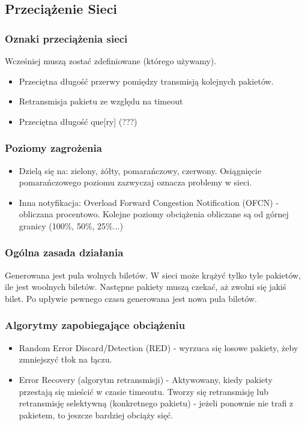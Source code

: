 		\subsection{Przeciążenie Sieci}
		
		\subsubsection{Oznaki przeciążenia sieci }
			Wcześniej muszą zostać zdefiniowane (którego używamy).
			\begin{itemize}
				\item Przeciętna długość przerwy pomiędzy transmisją kolejnych pakietów.
				\item Retransmisja pakietu ze względu na timeout
				\item Przeciętna długość que[ry] (???)
			\end{itemize}
				\subsubsection{Poziomy zagrożenia}
				\begin{itemize}
					\item Dzielą się na: zielony, żółty, pomarańczowy, czerwony. Osiągnięcie pomarańczowego poziomu zazwyczaj oznacza problemy w sieci.
					\item Inna notyfikacja: Overload Forward Congestion Notification (OFCN) - obliczana procentowo. Kolejne poziomy obciążenia obliczane są od górnej granicy (100\%, 50\%, 25\%...)
				\end{itemize}
			\subsubsection{Ogólna zasada działania}
				Generowana jest pula wolnych biletów. W sieci może krążyć tylko tyle pakietów, ile jest woolnych biletów. Następne pakiety muszą czekać, aż zwolni się jakiś bilet. Po upływie pewnego czasu generowana jest nowa pula biletów.
			\subsubsection{Algorytmy zapobiegające obciążeniu}
				\begin{itemize}
					\item Random Error Discard/Detection (RED) - wyrzuca się losowe pakiety, żeby zmniejszyć tłok na łączu.
					\item Error Recovery (algorytm retransmisji) - Aktywowany, kiedy pakiety przestają się mieścić w czasie timeoutu. Tworzy się retransmisję lub retransmisję selektywną (konkretnego pakietu) - jeżeli ponownie nie trafi z pakietem, to jeszcze bardziej obciąży sięć.
				\end{itemize}
			
